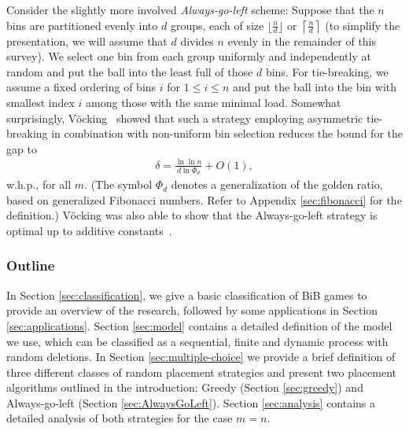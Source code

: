 \documentclass[a4paper,12pt]{article}
\begin{document}
Consider the slightly more involved \emph{Always-go-left} scheme: Suppose that the $n$ bins are partitioned evenly into $d$ groups, each of size $\lfloor \frac{n}{d}\rfloor$ or $\left\lceil\frac{n}{d}\right\rceil$ (to simplify the presentation, we will assume that $d$ divides $n$ evenly in the remainder of this survey). We select one bin from each group uniformly and independently at random and put the ball into the least full of those $d$ bins. For tie-breaking, we assume a fixed ordering of bins $i$ for $1 \leq i \leq n$ and put the ball into the bin with smallest index $i$ among those with the same minimal load. Somewhat surprisingly, V\"ocking~\cite{VOC03} showed that such a strategy employing asymmetric tie-breaking in combination with non-uniform bin selection reduces the bound for the gap to\
\begin{align*}
\delta = \frac{\ln\ln n}{d  \ln \Phi_d} + O(1),
\end{align*}
w.h.p., for all $m$. (The symbol $\Phi_d$ denotes a generalization of the golden ratio, based on generalized Fibonacci numbers. Refer to Appendix \ref{sec:fibonacci} for the definition.) V\"ocking was also able to show that the Always-go-left strategy is optimal up to additive constants~\cite{VOC03}.

\subsubsection*{Outline}
In Section \ref{sec:classification}, we give a basic classification of BiB games to provide an overview of the research, followed by some applications in Section \ref{sec:applications}. Section \ref{sec:model} contains a detailed definition of the model we use, which can be classified as a sequential, finite and dynamic process with random deletions. In Section \ref{sec:multiple-choice} we provide a brief definition of three different classes of random placement strategies and present two placement algorithms outlined in the introduction: Greedy (Section \ref{sec:greedy}) and Always-go-left (Section \ref{sec:AlwaysGoLeft}). Section \ref{sec:analysis} contains a detailed analysis of both strategies for the case $m=n$. 
\end{document}
